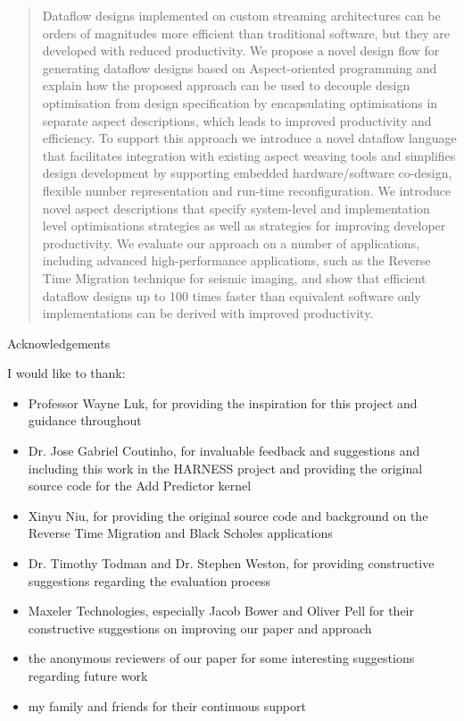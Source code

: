 \documentclass[a4paper, 11pt]{report}
\newcommand\acknowledgements[1]{
  \typeout{Acknowledgements}
  \thispagestyle{plain}
  \begin{center}{\huge{Acknowledgements} \par}\end{center}
      {\normalsize #1}
      \vfil\vfil\null
}
\begin{document}


\renewcommand{\thepage}{\roman{page}}


\begin{abstract}
  \vspace{1em} Dataflow designs implemented on custom streaming
  architectures can be orders of magnitudes more efficient than
  traditional software, but they are developed with reduced
  productivity.  We propose a novel design flow for generating
  dataflow designs based on Aspect-oriented programming and explain
  how the proposed approach can be used to decouple design
  optimisation from design specification by encapsulating
  optimisations in separate aspect descriptions, which leads to
  improved productivity and efficiency. To support this approach we
  introduce a novel dataflow language that facilitates integration
  with existing aspect weaving tools and simplifies design development
  by supporting embedded hardware/software co-design, flexible number
  representation and run-time reconfiguration. We introduce novel
  aspect descriptions that specify system-level and implementation
  level optimisations strategies as well as strategies for improving
  developer productivity. We evaluate our approach on a number of
  applications, including advanced high-performance applications, such
  as the Reverse Time Migration technique for seismic imaging, and
  show that efficient dataflow designs up to 100 times faster than
  equivalent software only implementations can be derived with
  improved productivity.
\end{abstract}


\acknowledgements{

  I would like to thank:
\begin{itemize}
\item Professor Wayne Luk, for providing the inspiration for this
  project and guidance throughout
  \item Dr. Jose Gabriel Coutinho, for invaluable feedback and
    suggestions and including this work in the HARNESS project and
    providing the original source code for the Add Predictor kernel
  \item Xinyu Niu, for providing the original source code and
    background on the Reverse Time Migration and Black Scholes
    applications
  \item Dr. Timothy Todman and Dr. Stephen Weston, for providing
    constructive suggestions regarding the evaluation process
  \item Maxeler Technologies, especially Jacob Bower and Oliver Pell
    for their constructive suggestions on improving our paper and
    approach
  \item the anonymous reviewers of our paper for some interesting
    suggestions regarding future work
  \item my family and friends for their continuous support
\end{itemize}

}
\end{document}

